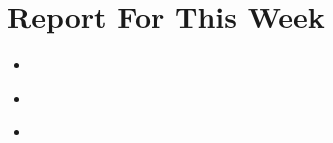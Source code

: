\documentclass[11pt,a4paper]{article}
\begin{document}
\vspace{2em}

\section*{Report For This Week}

\begin{tcolorbox}[modernbox, title={Weekly Activities}]

    \begin{tcolorbox}[timelinebox={DD/MM/YYYY \textmd{\textcolor{gray}{(Day)}}}]
        \begin{itemize}[leftmargin=*, noitemsep]
            \item %
        \end{itemize}
    \end{tcolorbox}
    

\end{tcolorbox}

\vspace{1em}

\begin{tcolorbox}[modernbox, title={Knowledge / Skills Gained}]
    \begin{itemize}[leftmargin=*, noitemsep]
        \item %
    \end{itemize}
\end{tcolorbox}

\vspace{1em}

\begin{tcolorbox}[modernbox, title={Problems / Comments / Other Info}]
    \begin{itemize}[leftmargin=*, noitemsep]
        \item %
    \end{itemize}
\end{tcolorbox}
\end{document}
